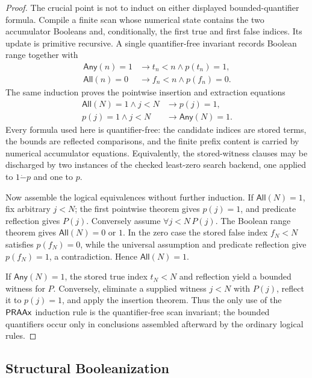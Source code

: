\begin{proof}
The crucial point is not to induct on either displayed bounded-quantifier formula.  Compile a finite scan whose numerical state contains the two accumulator Booleans and, conditionally, the first true and first false indices.  Its update is primitive recursive.  A single quantifier-free invariant records Boolean range together with
\begin{align*}
 \mathsf{Any}(n)=1&\to t_n<n\wedge p(t_n)=1,\\
 \mathsf{All}(n)=0&\to f_n<n\wedge p(f_n)=0.
\end{align*}
The same induction proves the pointwise insertion and extraction equations
\begin{align*}
 \mathsf{All}(N)=1\wedge j<N&\to p(j)=1,\\
 p(j)=1\wedge j<N&\to \mathsf{Any}(N)=1.
\end{align*}
Every formula used here is quantifier-free: the candidate indices are stored terms, the bounds are reflected comparisons, and the finite prefix content is carried by numerical accumulator equations.  Equivalently, the stored-witness clauses may be discharged by two instances of the checked least-zero search backend, one applied to \(1\mathbin{\dot-}p\) and one to \(p\).

Now assemble the logical equivalences without further induction.  If \(\mathsf{All}(N)=1\), fix arbitrary \(j<N\); the first pointwise theorem gives \(p(j)=1\), and predicate reflection gives \(P(j)\).  Conversely assume \(\forall j<N\,P(j)\).  The Boolean range theorem gives \(\mathsf{All}(N)=0\) or \(1\).  In the zero case the stored false index \(f_N<N\) satisfies \(p(f_N)=0\), while the universal assumption and predicate reflection give \(p(f_N)=1\), a contradiction.  Hence \(\mathsf{All}(N)=1\).

If \(\mathsf{Any}(N)=1\), the stored true index \(t_N<N\) and reflection yield a bounded witness for \(P\).  Conversely, eliminate a supplied witness \(j<N\) with \(P(j)\), reflect it to \(p(j)=1\), and apply the insertion theorem.  Thus the only use of the \(\mathsf{PRAAx}\) induction rule is the quantifier-free scan invariant; the bounded quantifiers occur only in conclusions assembled afterward by the ordinary logical rules.
\end{proof}

\subsection{Structural Booleanization}

